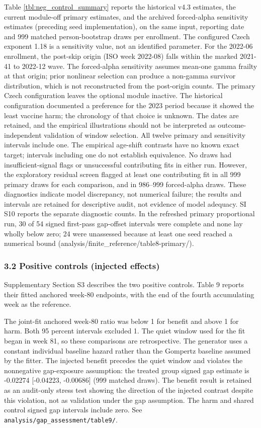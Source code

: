 \documentclass[
]{article}
\newcounter{none} %
\begin{document}
Table \ref{tbl:neg_control_summary} reports the historical v4.3 estimates, the current module-off primary estimates, and the archived forced-alpha sensitivity estimates (preceding seed implementation), on the same input, reporting date and 999 matched person-bootstrap draws per enrollment. The configured Czech exponent 1.18 is a sensitivity value, not an identified parameter. For the 2022-06 enrollment, the post-skip origin (ISO week 2022-08) falls within the marked 2021-41 to 2022-12 wave. The forced-alpha sensitivity assumes mean-one gamma frailty at that origin; prior nonlinear selection can produce a non-gamma survivor distribution, which is not reconstructed from the post-origin counts. The primary Czech configuration leaves the optional module inactive. The historical configuration documented a preference for the 2023 period because it showed the least vaccine harm; the chronology of that choice is unknown. The dates are retained, and the empirical illustrations should not be interpreted as outcome-independent validation of window selection. All twelve primary and sensitivity intervals include one. The empirical age-shift contrasts have no known exact target; intervals including one do not establish equivalence. No draws had insufficient-signal flags or unsuccessful contributing fits in either run. However, the exploratory residual screen flagged at least one contributing fit in all 999 primary draws for each comparison, and in 986--999 forced-alpha draws. These diagnostics indicate model discrepancy, not numerical failure; the results and intervals are retained for descriptive audit, not evidence of model adequacy. SI S10 reports the separate diagnostic counts. In the refreshed primary proportional run, 30 of 54 signed first-pass gap-offset intervals were complete and none lay wholly below zero; 24 were unassessed because at least one seed reached a numerical bound (analysis/finite\_reference/table8-primary/).

\subsubsection{3.2 Positive controls (injected effects)}\label{positive-controls-injected-effects}

Supplementary Section S3 describes the two positive controls. Table 9 reports their fitted anchored week-80 endpoints, with the end of the fourth accumulating week as the reference.

The joint-fit anchored week-80 ratio was below 1 for benefit and above 1 for harm. Both 95 percent intervals excluded 1. The quiet window used for the fit began in week 81, so these comparisons are retrospective. The generator uses a constant individual baseline hazard rather than the Gompertz baseline assumed by the fitter. The injected benefit precedes the quiet window and violates the nonnegative gap-exposure assumption: the treated group signed gap estimate is -0.02274 {[}-0.04223, -0.00686{]} (999 matched draws). The benefit result is retained as an audit-only stress test showing the direction of the injected contrast despite this violation, not as validation under the gap assumption. The harm and shared control signed gap intervals include zero. See \texttt{analysis/gap\_assessment/table9/}.
\end{document}
